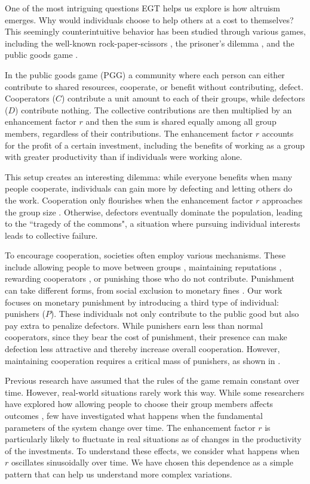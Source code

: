 One of the most intriguing questions EGT helps us explore is how altruism emerges. Why would individuals choose to help others at a cost to themselves? This seemingly counterintuitive behavior has been studied through various games, including the well-known rock-paper-scissors \cite{RPSCooperation}, the prisoner's dilemma \cite{Prisionero}, and the public goods game \cite{PublicGoods}.

In the public goods game (PGG) a community where each person can either contribute to shared resources, cooperate, or benefit without contributing, defect. Cooperators ($C$) contribute a unit amount to each of their groups, while defectors ($D$) contribute nothing. The collective contributions are then multiplied by an enhancement factor $r$ and then the sum is shared equally among all group members, regardless of their contributions. The enhancement factor $r$ accounts for the profit of a certain investment, including the benefits of working as a group with greater productivity than if individuals were working alone.

This setup creates an interesting dilemma: while everyone benefits when many people cooperate, individuals can gain more by defecting and letting others do the work. Cooperation only flourishes when the enhancement factor $r$ approaches the group size \cite{r/G}. Otherwise, defectors eventually dominate the population, leading to the ``tragedy of the commons", a situation where pursuing individual interests leads to collective failure.


To encourage cooperation, societies often employ various mechanisms. These include allowing people to move between groups \cite{Migration}, maintaining reputations \cite{Reputation}, rewarding cooperators \cite{Reward}, or punishing those who do not contribute. Punishment can take different forms, from social exclusion \cite{SocialExclusion} to monetary fines \cite{Punish2}. Our work focuses on monetary punishment by introducing a third type of individual: punishers ($P$). These individuals not only contribute to the public good but also pay extra to penalize defectors. While punishers earn less than normal cooperators, since they bear the cost of punishment, their presence can make defection less attractive and thereby increase overall cooperation. However, maintaining cooperation requires a critical mass of punishers, as shown in \cite{SocialExclusion}.


Previous research have assumed that the rules of the game remain constant over time. However, real-world situations rarely work this way. While some researchers have explored how allowing people to choose their group members affects outcomes \cite{EdgeRule}, few have investigated what happens when the fundamental parameters of the system change over time. The enhancement factor $r$ is particularly likely to fluctuate in real situations as of changes in the productivity of the investments. To understand these effects, we consider what happens when $r$ oscillates sinusoidally over time. We have chosen this dependence as a simple pattern that can help us understand more complex variations. 

